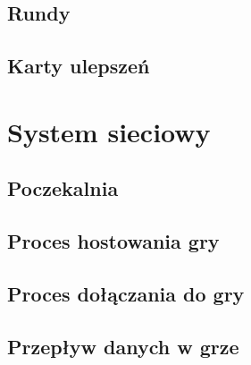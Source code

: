 \subsection{Rundy}
\subsection{Karty ulepszeń}


\section{System sieciowy}
\subsection{Poczekalnia}
\subsection{Proces hostowania gry}
\subsection{Proces dołączania do gry}
\subsection{Przepływ danych w grze}